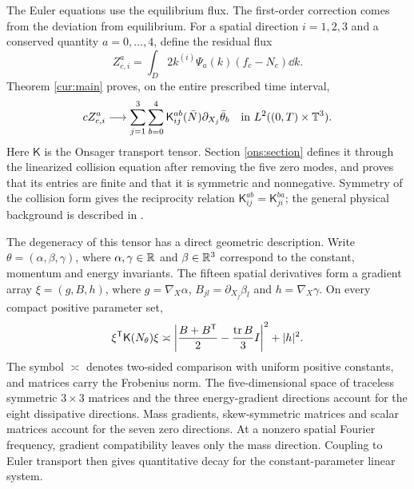 The Euler equations use the equilibrium flux. The first-order correction
comes from the deviation from equilibrium. For a spatial direction
$i=1,2,3$ and a conserved quantity $a=0,\ldots,4$, define the residual flux
\begin{equation}\label{intro:remaining-flux}
 Z_{c,i}^a=\int_D2k^{(i)}\Psi_a(k)(f_c-N_c)\dd k.
\end{equation}
Theorem \ref{cur:main} proves, on the entire prescribed time interval,
\begin{equation}\label{intro:transport-limit}
 cZ_{c,i}^a\longrightarrow
 \sum_{j=1}^3\sum_{b=0}^4
 \mathsf K_{ij}^{ab}(\bar N)\partial_{X_j}\bar\theta_b
 \quad\text{in }L^2((0,T)\times\mathbb T^3).
\end{equation}
Here $\mathsf K$ is the Onsager transport tensor. Section \ref{ons:section}
defines it through the linearized collision equation after removing the
five zero modes, and proves that its entries are finite and that it is
symmetric and nonnegative. Symmetry of the collision form gives the
reciprocity relation $\mathsf K_{ij}^{ab}=\mathsf K_{ji}^{ba}$;
the general physical background is described in \cite{Onsager1931}.

The degeneracy of this tensor has a direct geometric description.
Write $\theta=(\alpha,\beta,\gamma)$, where $\alpha,\gamma\in\mathbb R$ and
$\beta\in\mathbb R^3$ correspond to the constant, momentum and energy invariants.
The fifteen spatial derivatives form a gradient array $\xi=(g,B,h)$,
where $g=\nabla_X\alpha$, $B_{jl}=\partial_{X_j}\beta_l$ and
$h=\nabla_X\gamma$. On every compact positive parameter set,
\begin{equation}\label{intro:onsager-degeneracy}
 \xi^{\mathsf T}\mathsf K(N_\theta)\xi
 \asymp
 \left|\frac{B+B^{\mathsf T}}2-\frac{\operatorname{tr} B}{3}I\right|^2+|h|^2.
\end{equation}
The symbol $\asymp$ denotes two-sided comparison with uniform positive
constants, and matrices carry the Frobenius norm.
The five-dimensional space of traceless symmetric $3\times3$ matrices
and the three energy-gradient directions account for the eight dissipative
directions. Mass gradients, skew-symmetric matrices and scalar matrices
account for the seven zero directions. At a nonzero spatial Fourier
frequency, gradient compatibility leaves only the mass direction.
Coupling to Euler transport then gives quantitative decay for the
constant-parameter linear system.

